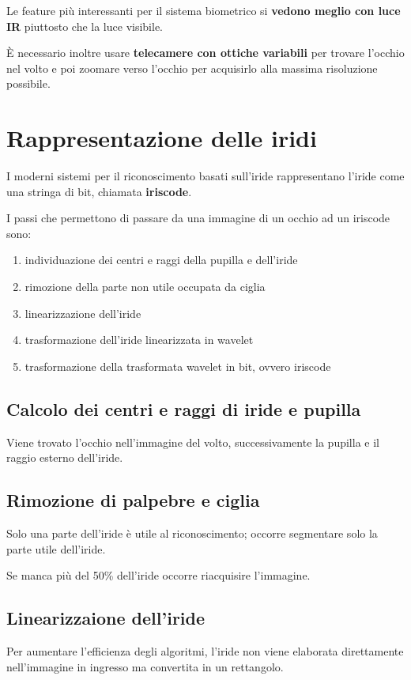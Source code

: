 \documentclass{report}
\begin{document}
\noindent Le feature più interessanti per il sistema biometrico si \textbf{vedono meglio con luce IR} 
piuttosto che la luce visibile.

\noindent È necessario inoltre usare \textbf{telecamere con ottiche variabili} per trovare
l'occhio nel volto e poi zoomare verso l'occhio per acquisirlo alla massima
risoluzione possibile.

\section{Rappresentazione delle iridi}
I moderni sistemi per il riconoscimento basati sull'iride rappresentano l'iride come 
una stringa di bit, chiamata \textbf{iriscode}.

\noindent I passi che permettono di passare da una immagine di un occhio ad un iriscode sono:
\begin{enumerate}
    \item individuazione dei centri e raggi della pupilla e dell'iride 
    \item rimozione della parte non utile occupata da ciglia 
    \item linearizzazione dell'iride
    \item trasformazione dell'iride linearizzata in wavelet
    \item trasformazione della trasformata wavelet in bit, ovvero iriscode
\end{enumerate}

\subsection{Calcolo dei centri e raggi di iride e pupilla}
Viene trovato l'occhio nell'immagine del volto, successivamente la pupilla 
e il raggio esterno dell'iride.

\subsection{Rimozione di palpebre e ciglia}
Solo una parte dell'iride è utile al riconoscimento; occorre segmentare 
solo la parte utile dell'iride.

\noindent Se manca più del 50\% dell'iride occorre riacquisire l'immagine.

\subsection{Linearizzaione dell'iride}
Per aumentare l'efficienza degli algoritmi, l'iride non viene elaborata
direttamente nell'immagine in ingresso ma convertita in un rettangolo.
\end{document}
